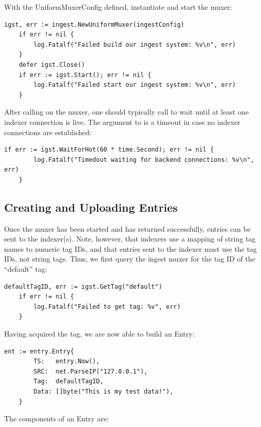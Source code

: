 With the UniformMuxerConfig defined, instantiate and start the muxer:

\begin{Verbatim}[breaklines=true]
    igst, err := ingest.NewUniformMuxer(ingestConfig)
    if err != nil {
        log.Fatalf("Failed build our ingest system: %v\n", err)
    }
    defer igst.Close()
    if err := igst.Start(); err != nil {
        log.Fatalf("Failed start our ingest system: %v\n", err)
    }
\end{Verbatim}


After calling  on the muxer, one should typically call
 to wait until at least one indexer connection is live.
The argument to  is a timeout in case no indexer
connections are established:

\begin{Verbatim}[breaklines=true]
    if err := igst.WaitForHot(60 * time.Second); err != nil {
        log.Fatalf("Timedout waiting for backend connections: %v\n", err)
    }
\end{Verbatim}


\subsection{Creating and Uploading Entries}

Once the muxer has been started and  has returned
successfully, entries can be sent to the indexer(s). Note, however, that
indexers use a mapping of string tag names to numeric tag IDs, and that
entries sent to the indexer must use the  tag IDs, not string
tags. Thus, we first query the ingest muxer for the tag ID of the
``default'' tag:

\begin{Verbatim}[breaklines=true]
    defaultTagID, err := igst.GetTag("default")
    if err != nil {
        log.Fatalf("Failed to get tag: %v", err)
    }
\end{Verbatim}

Having acquired the tag, we are now able to build an Entry:

\begin{Verbatim}[breaklines=true]
    ent := entry.Entry{
        TS:   entry.Now(),
        SRC:  net.ParseIP("127.0.0.1"),
        Tag:  defaultTagID,
        Data: []byte("This is my test data!"),
    }

\end{Verbatim}


The components of an Entry are:

